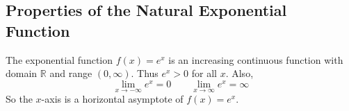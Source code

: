 \subsection*{Properties of the Natural Exponential Function}

The exponential function \( f(x)=e^x \) is an increasing continuous function with domain \( \mathbb{R} \) and range \( (0, \infty) \). Thus \( e^x > 0 \) for all \(x\). Also, 
\[ \lim_{x \to -\infty}{e^x} = 0 \quad \quad \lim_{x \to \infty}{e^x} = \infty \]
So the \(x\)-axis is a horizontal asymptote of \(f(x)=e^x\).
